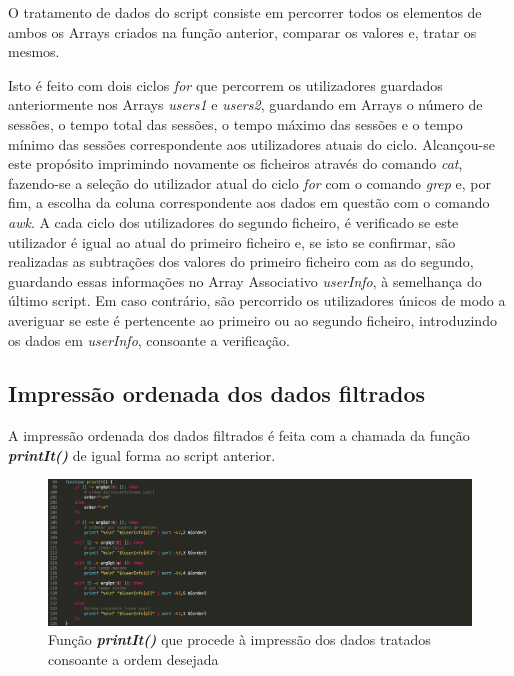 \documentclass[10pt,portuguese]{article}
\begin{document}
\par O tratamento de dados do script consiste em percorrer todos os elementos de ambos os Arrays criados na função anterior, comparar os valores e, tratar os mesmos. 
\par Isto é feito com dois ciclos \textit{for} que percorrem os utilizadores guardados anteriormente nos Arrays \textit{users1} e \textit{users2}, guardando em Arrays o número de sessões, o tempo total das sessões, o tempo máximo das sessões e o tempo mínimo das sessões correspondente aos utilizadores atuais do ciclo. Alcançou-se este propósito imprimindo novamente os ficheiros através do comando \textit{cat}, fazendo-se a seleção do utilizador atual do ciclo \textit{for} com o comando \textit{grep} e, por fim, a escolha da coluna correspondente aos dados em questão com o comando \textit{awk}. 
\Par A cada ciclo dos utilizadores do segundo ficheiro, é verificado se este utilizador é igual ao atual do primeiro ficheiro e, se isto se confirmar, são realizadas as subtrações dos valores do primeiro ficheiro com as do segundo, guardando essas informações no Array Associativo \textit{userInfo}, à semelhança do último script. Em caso contrário, são percorrido os utilizadores únicos de modo a averiguar se este é pertencente ao primeiro ou ao segundo ficheiro, introduzindo os dados em \textit{userInfo}, consoante a verificação.

\clearpage

\subsection{Impressão ordenada dos dados filtrados}
\par A impressão ordenada dos dados filtrados é feita com a chamada da função \textbf{\textit{printIt()}} de igual forma ao script anterior.
\begin{figure}[!h]
    \centering
    \includegraphics[width=\textwidth]{comparestats/printit_c.png}
    \caption{Função \textbf{\textit{printIt()}} que procede à impressão dos dados tratados consoante a ordem desejada}
\end{figure}
\end{document}
